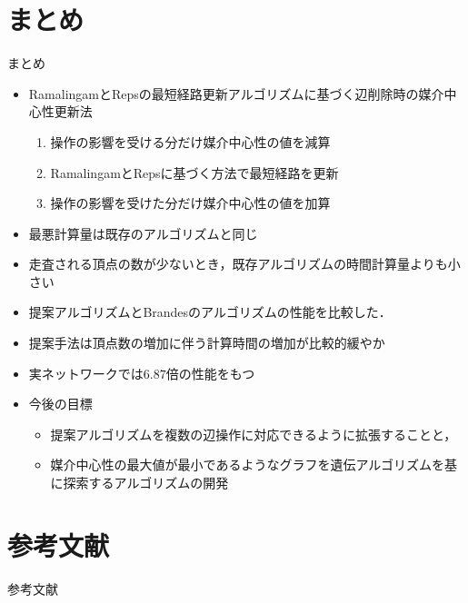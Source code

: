 \documentclass[dvipdfmx,fleqn]{beamer}
\begin{document}
\section{まとめ}
\begin{frame}[allowframebreaks]{まとめ}
  \begin{itemize}
  \item RamalingamとRepsの最短経路更新アルゴリズムに基づく辺削除時の媒介中心性更新法
    \begin{enumerate}
    \item 操作の影響を受ける分だけ媒介中心性の値を減算
    \item RamalingamとRepsに基づく方法で最短経路を更新
    \item 操作の影響を受けた分だけ媒介中心性の値を加算
    \end{enumerate}
  \item 最悪計算量は既存のアルゴリズムと同じ
  \item 走査される頂点の数が少ないとき，既存アルゴリズムの時間計算量よりも小さい
  \item 提案アルゴリズムとBrandesのアルゴリズムの性能を比較した．
  \item 提案手法は頂点数の増加に伴う計算時間の増加が比較的緩やか
  \item 実ネットワークでは$6.87$倍の性能をもつ
  \item 今後の目標
    \begin{itemize}
    \item 提案アルゴリズムを複数の辺操作に対応できるように拡張することと，
    \item 媒介中心性の最大値が最小であるようなグラフを遺伝アルゴリズムを基に探索するアルゴリズムの開発
    \end{itemize}
  \end{itemize}
\end{frame}

\appendix
\section{参考文献}
\begin{frame}[allowframebreaks]{参考文献}
  \nocite{01Watts1998}
  \nocite{02Barabasi1999}
  \nocite{03Beauchamp1965}
  \nocite{04Bonacich1991}
  \nocite{05Freeman1977}
  \nocite{06Brandes2001}
  \nocite{07Puzis2012}
  \nocite{08Bentert2018}
  \nocite{09Erdos2015}
  \nocite{10Bader2006}
  \nocite{11Tan2009}
  \nocite{12Edmonds2010}
  \nocite{13Bernaschi2016}
  \nocite{14Brandes2007}
  \nocite{15Bader2007}
  \nocite{16Pfeffer2012}
  \nocite{17Yoshida2014}
  \nocite{18Holme2012}
  \nocite{19Lee2012}
  \nocite{20Singh2015}
  \nocite{21Hayashi2015}
  \nocite{22Bergamini2015a}
  \nocite{23Bergamini2015b}
  \nocite{24Ramalingam1996}
  \nocite{25Kas2013}
  \nocite{26Karger1993}
  \nocite{27Nasre2014a}
  \nocite{28Demetrescu2003}
  \nocite{29Nasre2014b}
  \nocite{30Pontecorvi2015}
  \nocite{31Bergamini2017}
  \nocite{32Leskovec2016}
  \nocite{33Rozemberczki2019b}
  \nocite{34OpenStreetMap}
  \printbibliography[title=]
\end{frame}
\end{document}
